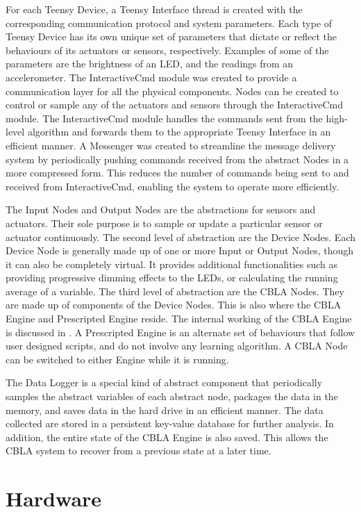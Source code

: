 For each Teensy Device, a Teensy Interface thread is created with the corresponding communication protocol and system parameters. Each type of Teensy Device has its own unique set of parameters that dictate or reflect the behaviours of its actuators or sensors, respectively. Examples of some of the parameters are the brightness of an LED, and the readings from an accelerometer. The InteractiveCmd module was created to provide a communication layer for all the physical components. Nodes can be created to control or sample any of the actuators and sensors through the InteractiveCmd module. The InteractiveCmd module handles the commands sent from the high-level algorithm and forwards them to the appropriate Teensy Interface in an efficient manner. A Messenger was created to streamline the message delivery system by periodically pushing commands received from the abstract Nodes in a more compressed form. This reduces the number of commands being sent to and received from InteractiveCmd, enabling the system to operate more efficiently.

The Input Nodes and Output Nodes are the abstractions for sensors and actuators. Their sole purpose is to sample or update a particular sensor or actuator continuously. The second level of abstraction are the Device Nodes. Each Device Node is generally made up of one or more Input or Output Nodes, though it can also be completely virtual. It provides additional functionalities such as providing progressive dimming effects to the LEDs, or calculating the running average of a variable. The third level of abstraction are the CBLA Nodes. They are made up of components of the Device Nodes. This is also where the CBLA Engine and Prescripted Engine reside. The internal working of the CBLA Engine is discussed in . A Prescripted Engine is an alternate set of behaviours that follow user designed scripts, and do not involve any learning algorithm. A CBLA Node can be switched to either Engine while it is running. 

The Data Logger is a special kind of abstract component that periodically samples the abstract variables of each abstract node, packages the data in the memory, and saves data in the hard drive in an efficient manner. The data collected are stored in a persistent key-value database for further analysis. In addition, the entire state of the CBLA Engine is also saved. This allows the CBLA system to recover from a previous state at a later time.


\section{Hardware} \label{sec:hardware}

